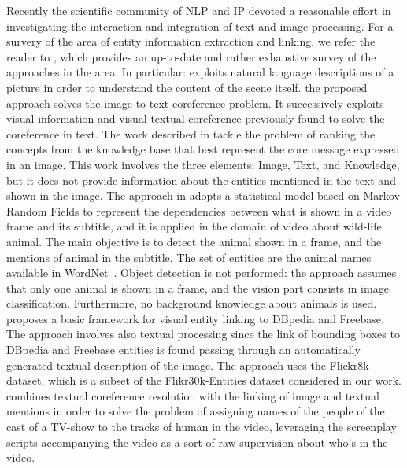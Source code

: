 \documentclass[11pt,a4paper]{article}
\begin{document}
Recently the scientific community of NLP and IP devoted a reasonable
effort in investigating the interaction and integration of text and
image processing.  For a survery of the area of entity information
extraction and linking, we refer the reader to
\cite{martinez2018information}, which provides an up-to-date and
rather exhaustive survey of the approaches in the area.  In
particular: \cite{KongCVPR14} exploits natural language descriptions
of a picture in order to understand the content of the scene itself. 
the proposed approach solves the image-to-text coreference problem. 
It successively exploits visual information and visual-textual
coreference previously found to solve the coreference in text.
The work described in
\cite{weiland2017using,weiland2018knowledge}
tackle the problem of ranking the concepts from the knowledge base that
best represent the core message expressed in an image. This work
involves the three elements: Image, Text, and Knowledge, but it does
not provide information about the entities mentioned in the text and
shown in the image.  The approach in \cite{venkitasubramanian2017entity}
adopts a statistical model based on Markov Random Fields to represent
the dependencies between what is shown in a video frame and its
subtitle, and it is applied in the domain of video about wild-life animal. The main objective is
to detect the animal shown in a frame, and the mentions of animal
in the subtitle. The set of entities are the animal
names available in WordNet~\cite{wordnet}. Object detection is not
performed: the approach assumes that only one animal is shown in a
frame, and the vision part consists in image
classification. Furthermore, no background knowledge about animals is
used.  \cite{tilak2017visual} proposes a basic framework for visual
entity linking to DBpedia and Freebase. 
The approach involves also textual processing since the link of bounding boxes
to DBpedia and Freebase entities is found passing through an automatically
generated textual description of the image. The approach uses the Flickr8k dataset,
which is a subset of the Flikr30k-Entities dataset considered in our work.
\cite{ramanathan2014linking} combines textual coreference resolution with 
the linking of image and textual mentions in order to solve the problem
of assigning names of the people of the cast of a TV-show to the tracks of human
in the video, leveraging the screenplay scripts accompanying the video as a sort of 
raw supervision about who's in the video.
\end{document}

